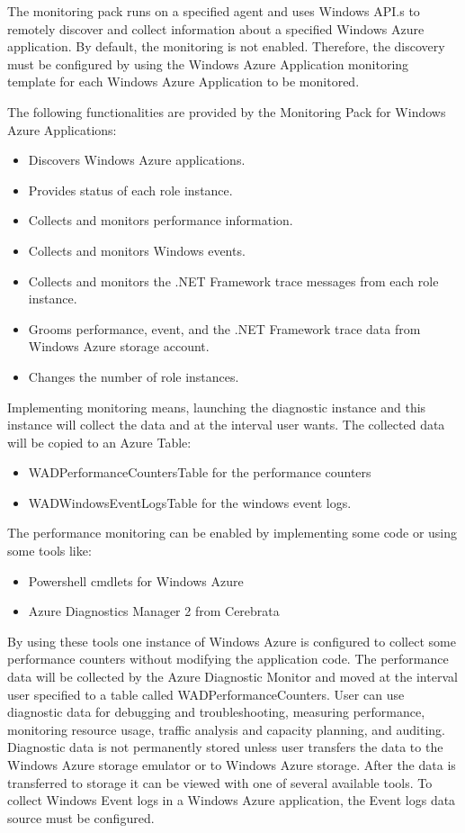 \documentclass{sig-alternate-05-2015}
\begin{document}
The monitoring pack runs on a specified agent and uses Windows API.s to remotely discover and collect information about a specified Windows Azure application. By default, the monitoring is not enabled. Therefore, the discovery must be configured by using the Windows Azure Application monitoring template for each Windows Azure Application to be monitored.

The following functionalities are provided by the Monitoring Pack for Windows Azure Applications:

\begin{itemize}
 \item Discovers Windows Azure applications.
 \item Provides status of each role instance.
 \item Collects and monitors performance information.
 \item Collects and monitors Windows events.
 \item Collects and monitors the .NET Framework trace messages from each role instance.
 \item Grooms performance, event, and the .NET Framework trace data from Windows Azure storage account.
 \item Changes the number of role instances.
\end{itemize}

Implementing monitoring means, launching the diagnostic instance and this instance will collect the data and at the interval user wants. The collected data will be copied to an Azure Table:

\begin{itemize}
\item WADPerformanceCountersTable for the performance counters
\item WADWindowsEventLogsTable for the windows event logs.
\end{itemize}

The performance monitoring can be enabled by implementing some code or using some tools like:

\begin{itemize}
  \item Powershell cmdlets for Windows Azure~\cite{cmdlets}
  \item Azure Diagnostics Manager 2 from Cerebrata~\cite{cerebrata}
\end{itemize}

By using these tools one instance of Windows Azure is configured to collect some performance counters without modifying the application code. The performance data will be collected by the Azure Diagnostic Monitor and moved at the interval user specified to a table called WADPerformanceCounters. User can use diagnostic data for debugging and troubleshooting, measuring performance, monitoring resource usage, traffic analysis and capacity planning, and auditing. Diagnostic data is not permanently stored unless user transfers the data to the Windows Azure storage emulator or to Windows Azure storage. After the data is transferred to storage it can be viewed with one of several available tools. To collect Windows Event logs in a Windows Azure application, the Event logs data source must be configured.
\end{document}
